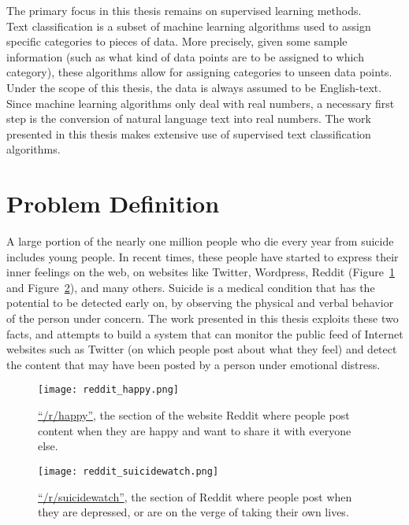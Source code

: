 The primary focus in this thesis remains on supervised learning methods.\\

Text classification is a subset of machine learning algorithms used to assign specific categories to pieces of data. More precisely, given some sample information (such as what kind of data points are to be assigned to which category), these algorithms allow for assigning categories to unseen data points. Under the scope of this thesis, the data is always assumed to be English-text. Since machine learning algorithms only deal with real numbers, a necessary first step is the conversion of natural language text into real numbers. The work presented in this thesis makes extensive use of supervised text classification algorithms.

\section{Problem Definition}
A large portion of the nearly one million people who die every year from suicide includes young people. In recent times, these people have started to express their inner feelings on the web, on websites like Twitter, Wordpress, Reddit (Figure~\ref{fig:reddit_happy} and Figure~\ref{fig:reddit_suicidewatch}), and many others. Suicide is a medical condition that has the potential to be detected early on, by observing the physical and verbal behavior of the person under concern. The work presented in this thesis exploits these two facts, and attempts to build a system that can monitor the public feed of Internet websites such as Twitter (on which people post about what they feel) and detect the content that may have been posted by a person under emotional distress.\\

\begin{figure}[t!]
    \centering
    \texttt{[image: reddit\_happy.png]}
    \caption{\href{http://www.reddit.com/r/happy}{``/r/happy''}, the section of the website Reddit \cite{reddit} where people post content when they are happy and want to share it with everyone else.}
    \label{fig:reddit_happy}
\end{figure}

\begin{figure}[t!]
    \centering
    \texttt{[image: reddit\_suicidewatch.png]}
    \caption{\href{http://www.reddit.com/r/suicidewatch}{``/r/suicidewatch''}, the section of Reddit \cite{reddit} where people post when they are depressed, or are on the verge of taking their own lives.}
    \label{fig:reddit_suicidewatch}
\end{figure}

